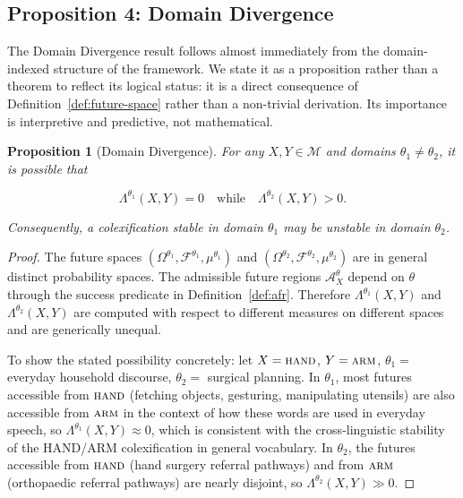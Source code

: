 \documentclass[12pt]{article}
\theoremstyle{rthm}
\newtheorem{proposition}[theorem]{Proposition}
\theoremstyle{rdef}
\theoremstyle{remark}
\newcommand{\M}{\mathcal{M}}
\newcommand{\A}{\mathcal{A}}
\newcommand{\Om}{\Omega}
\newcommand{\Lam}[1][\theta]{\Lambda^{#1}}
\begin{document}
\subsection{Proposition 4: Domain Divergence}
\label{subsec:t4}

The Domain Divergence result follows almost immediately from the domain-indexed
structure of the framework. We state it as a proposition rather than a theorem
to reflect its logical status: it is a direct consequence of Definition~\ref{def:future-space}
rather than a non-trivial derivation. Its importance is interpretive and
predictive, not mathematical.

\begin{proposition}[Domain Divergence]
\label{thm:domain}
For any $X, Y \in \M$ and domains $\theta_1 \neq \theta_2$, it is possible that

\[
\Lam[\theta_1](X,Y) = 0 \quad \text{while} \quad \Lam[\theta_2](X,Y) > 0.
\]

Consequently, a colexification stable in domain $\theta_1$ may be unstable in
domain $\theta_2$.
\end{proposition}

\begin{proof}
The future spaces $(\Om^{\theta_1}, \mathcal{F}^{\theta_1}, \mu^{\theta_1})$
and $(\Om^{\theta_2}, \mathcal{F}^{\theta_2}, \mu^{\theta_2})$ are in general
distinct probability spaces. The admissible future regions $\A_X^{\theta}$
depend on $\theta$ through the success predicate in Definition~\ref{def:afr}.
Therefore $\Lam[\theta_1](X,Y)$ and $\Lam[\theta_2](X,Y)$ are computed with
respect to different measures on different spaces and are generically unequal.

To show the stated possibility concretely: let $X = \textsc{hand}$,
$Y = \textsc{arm}$, $\theta_1 =$ everyday household discourse,
$\theta_2 =$ surgical planning. In $\theta_1$, most futures accessible from
$\textsc{hand}$ (fetching objects, gesturing, manipulating utensils) are also
accessible from $\textsc{arm}$ in the context of how these words are used in
everyday speech, so $\Lam[\theta_1](X,Y) \approx 0$, which is consistent with
the cross-linguistic stability of the HAND/ARM colexification in general
vocabulary. In $\theta_2$, the futures accessible from $\textsc{hand}$ (hand
surgery referral pathways) and from $\textsc{arm}$ (orthopaedic referral
pathways) are nearly disjoint, so $\Lam[\theta_2](X,Y) \gg 0$.
\end{proof}
\end{document}
